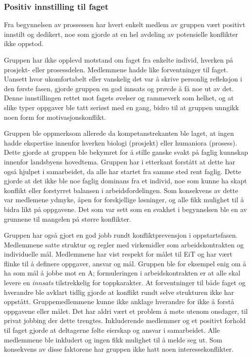 \subsubsection{Positiv innstilling til faget}
 
Fra begynnelsen av prossessen har hvert enkelt medlem av gruppen vært positivt innstilt og dedikert, noe som gjorde at en hel avdeling av potensielle konflikter ikke oppstod.

Gruppen har ikke opplevd motstand om faget fra enkelte individ, hverken på prosjekt- eller prosessdelen. 
Medlemmene hadde like forventninger til faget. Uansett hvor ukomfortabelt eller vanskelig det var å skrive personlig refleksjon i den første fasen, gjorde gruppen en god innsats og prøvde å få noe ut av det.
Denne innstillingen rettet mot fagets øvelser og rammeverk som helhet, og at slike typer oppgaver ble tatt seriøst med en gang, bidro til at gruppen unngikk noen form for motivasjonskonflikt.

Gruppen ble oppmerksom allerede da kompetanstrekanten ble laget, at ingen hadde ekspertise innenfor hverken biologi (prosjekt) eller humaniora (prosess).
 Dette gjorde at gruppen ble bekymret for å stille ganske svakt på faglig kunnskap innenfor landsbyens hovedtema.
Gruppen har i etterkant forstått at dette har også hjulpet i samarbeidet, da alle har startet fra samme sted rent faglig.
Dette gjorde at det ikke ble noe faglig dominans fra et individ, noe som kunne ha skapt konflikt eller forstyrret balansen i arbeidsfordelingen.
Som konsekvens av dette var medlemene ydmyke, åpen for forskjellige løsninger, og alle fikk mulighet til å bidra likt på oppgavene.
Det som var sett som en svakhet i begynnelsen ble en av grunnene til mangelen på større konflikter.

Gruppen har også gjort en god jobb rundt konfliktprevensjon i oppstartsfasen. 
Medlemmene satte struktur og regler med virkemidler som arbeidskontrakten og individuelle mål. 
Medlemmene har vist respekt for målet til EiT og har vært flinke til å definere oppgaver, ansvar og mål.
Gruppen ble for eksempel enig om å ha som mål å jobbe mot en A; formuleringen i arbeidskontrakten er at alle skal levere en \emph{innsats} tilstrekkelig for toppkarakter.
At forventninger til både faget og hverandre ble avklart tidlig gjorde at konflikt rundt selve strukturen ikke har oppstått. Gruppemedlemmene kunne ikke anklage hverandre for ikke å forstå oppgavene eller målet.
Det har aldri vært et problem å møte utenom onsdager, til privat jobbing der dette trengtes.
Inkluderende medlemmer og et positivt forhold til faget gjorde at deltagerne følte eierskap og ansvar i samarbeidet.
Alle medlemmene ble inkludert og ingen fikk mulighet til å melde seg ut.
Som konsekvens av disse faktorene har gruppen ikke hatt noen interessekonflikter.
